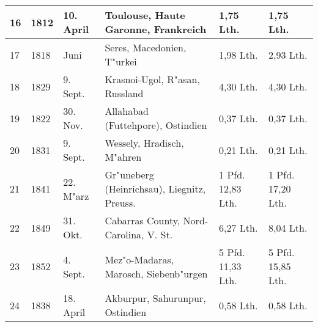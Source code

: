 \documentclass[a4paper, 11pt, oneside, german]{article}
\begin{document}
\begin{center}
\begin{footnotesize}
\begin{tabular}{ |p{7mm}|p{7mm}|p{13mm}|p{48mm}|p{22mm}|p{22mm}| }
    16 & 1812 & 10. April & Toulouse, Haute Garonne, Frankreich & 1,75 Lth. & 1,75 Lth.\\\hline
    17 & 1818 & Juni & Seres, Macedonien, T"urkei & 1,98 Lth. & 2,93 Lth.\\\hline
    18 & 1829 & 9. Sept. & Krasnoi-Ugol, R"asan, Russland & 4,30 Lth. & 4,30 Lth.\\\hline
    19 & 1822 & 30. Nov. & Allahabad (Futtehpore), Ostindien & 0,37 Lth. & 0,37 Lth.\\\hline
    20 & 1831 & 9. Sept. & Wessely, Hradisch, M"ahren & 0,21 Lth. & 0,21 Lth.\\\hline
    21 & 1841 & 22. M"arz & Gr"uneberg (Heinrichsau), Liegnitz, Preuss. & 1 Pfd. 12,83 Lth. & 1 Pfd. 17,20 Lth.\\\hline
    22 & 1849 & 31. Okt. & Cabarras County, Nord-Carolina, V. St. & 6,27 Lth. & 8,04 Lth.\\\hline
    23 & 1852 & 4. Sept. & Mez"o-Madaras, Marosch, Siebenb"urgen & 5 Pfd. 11,33 Lth. & 5 Pfd. 15,85 Lth.\\\hline
    24 & 1838 & 18. April & Akburpur, Sahurunpur, Ostindien & 0,58 Lth. & 0,58 Lth.\\
    \hline
\end{tabular}
\end{footnotesize}
\end{center}
\end{document}
